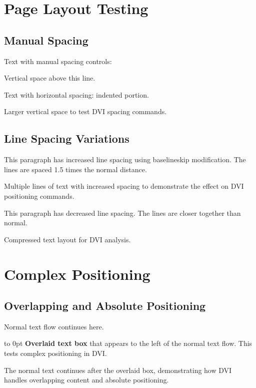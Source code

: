 \documentclass[10pt,twocolumn]{article}
\begin{document}
\section{Page Layout Testing}

\subsection{Manual Spacing}

Text with manual spacing controls:

\vspace{0.5cm}
Vertical space above this line.

Text with horizontal spacing: \hspace{1cm} indented portion.

\vspace{1cm}
Larger vertical space to test DVI spacing commands.

\subsection{Line Spacing Variations}

{\baselineskip
This paragraph has increased line spacing using baselineskip modification. The lines are spaced 1.5 times the normal distance.

Multiple lines of text with increased spacing to demonstrate the effect on DVI positioning commands.
}

{\baselineskip
This paragraph has decreased line spacing. The lines are closer together than normal.

Compressed text layout for DVI analysis.
}

\section{Complex Positioning}

\subsection{Overlapping and Absolute Positioning}

Normal text flow continues here.

\hbox to 0pt{%
\hspace{-2cm}%
\vbox{%
\hsize=4cm
\textbf{Overlaid text box} that appears to the left of the normal text flow.
This tests complex positioning in DVI.
}%
\hss
}

The normal text continues after the overlaid box, demonstrating how DVI handles overlapping content and absolute positioning.
\end{document}
